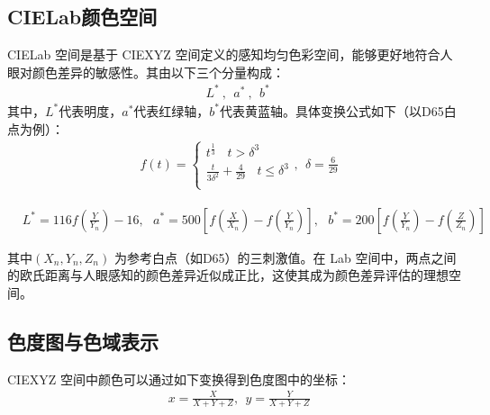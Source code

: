 \subsection[\hspace{-2pt}CIELab颜色空间]{{\heiti{} \hspace{-8pt}CIELab颜色空间}}\label{subsection2: CIELab颜色空间}

CIELab 空间是基于 CIEXYZ 空间定义的感知均匀色彩空间\cite{fairchild2013color,reinhard2010color}，能够更好地符合人眼对颜色差异的敏感性。其由以下三个分量构成：
\begin{equation}
\begin{aligned}
  &L^{*}\ ,\ \ a^{*}\ ,\ \ b^{*}\ 
\end{aligned}
\end{equation}
其中，$L^{*}$代表明度，$a^{*}$代表红绿轴，$b^{*}$代表黄蓝轴。具体变换公式如下（以D65白点为例）：
\begin{equation}
\begin{aligned}
  &f(t) = 
\begin{cases}
  t^{\frac{1}{3}}\ \ \ \ t>\delta^{3}\\
  \frac{t}{3\delta^{2}}+\frac{4}{29}\ \ \ \ t\leq \delta^{3}\\
\end{cases}
,\ \ \delta=\frac{6}{29}
\end{aligned}
\end{equation}

\begin{equation}
\begin{aligned}
  &L^{*} = 116f(\frac{Y}{Y_{n}})-16,\ \ \ a^{*}=500[f(\frac{X}{X_{n}})-f(\frac{Y}{Y_{n}})],\ \ \ b^{*} = 200[f(\frac{Y}{Y_{n}})-f(\frac{Z}{Z_{n}})]
\end{aligned}
\end{equation}

其中$(X_{n},Y_{n},Z_{n})$ 为参考白点（如D65）的三刺激值。在 Lab 空间中，两点之间的欧氏距离与人眼感知的颜色差异近似成正比，这使其成为颜色差异评估的理想空间。

\subsection[\hspace{-2pt}色度图与色域表示]{{\heiti{} \hspace{-8pt}色度图与色域表示}}\label{subsection2: 色度图与色域表示}

CIEXYZ 空间中颜色可以通过如下变换得到色度图中的坐标：
\begin{equation}
\begin{aligned}
  &x=\frac{X}{X+Y+Z},\ \ y=\frac{Y}{X+Y+Z}
\end{aligned}
\end{equation}

